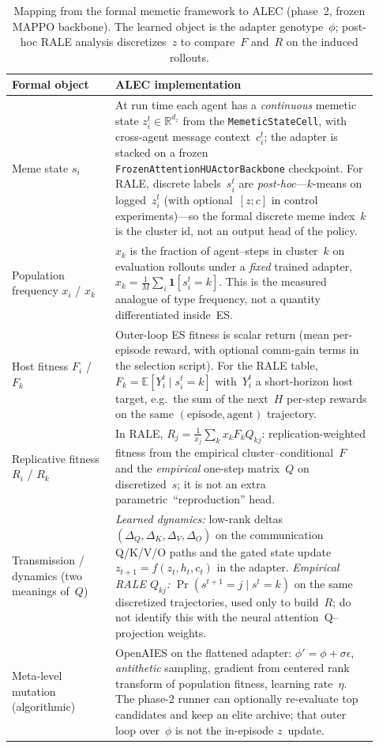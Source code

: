 
\begin{table}[t]
\centering
\small
\caption{Mapping from the formal memetic framework to ALEC (phase~2, frozen MAPPO backbone). The learned object is the adapter genotype~$\phi$; post-hoc RALE analysis discretizes~$z$ to compare~$F$ and~$R$ on the induced rollouts.}
\label{tab:alec_formal_mapping}
\begin{tabular}{p{0.26\linewidth}p{0.66\linewidth}}
\toprule
Formal object & ALEC implementation \\
\midrule
Meme state $s_i$ &
At run time each agent has a \emph{continuous} memetic state $z_i^t\in\mathbb{R}^{d_z}$ from the \texttt{MemeticStateCell}, with cross-agent message context~$c_i^t$; the adapter is stacked on a frozen \texttt{FrozenAttentionHUActorBackbone} checkpoint.
For RALE, discrete labels~$s_i^t$ are \emph{post-hoc}---$k$-means on logged~$z_i^t$ (with optional~$[z;c]$ in control experiments)---so the formal discrete meme index~$k$ is the cluster id, not an output head of the policy. \\[0.35em]
Population frequency $x_i$ / $x_k$ &
$x_k$ is the fraction of agent--steps in cluster~$k$ on evaluation rollouts under a \emph{fixed} trained adapter, $x_k=\frac{1}{M}\sum_i\mathbf{1}[s_i^t{=}k]$.
This is the measured analogue of type frequency, not a quantity differentiated inside~ES. \\[0.35em]
Host fitness $F_i$ / $F_k$ &
Outer-loop ES fitness is scalar return (mean per-episode reward, with optional comm-gain terms in the selection script). For the RALE table, $F_k=\mathbb{E}[Y_i^t\mid s_i^t{=}k]$ with~$Y_i^t$ a short-horizon host target, e.g.\ the sum of the next~$H$ per-step rewards on the same $(\text{episode},\text{agent})$ trajectory. \\[0.35em]
Replicative fitness $R_i$ / $R_k$ &
In RALE, $R_j=\frac{1}{x_j}\sum_k x_k F_k Q_{kj}$: replication-weighted fitness from the empirical cluster--conditional~$F$ and the \emph{empirical} one-step matrix~$Q$ on discretized~$s$; it is not an extra parametric~``reproduction'' head. \\[0.35em]
Transmission / dynamics (two meanings of~$Q$) &
\emph{Learned dynamics:} low-rank deltas $(\Delta_Q,\Delta_K,\Delta_V,\Delta_O)$ on the communication Q/K/V/O paths and the gated state update $z_{t+1}{=}f(z_t,h_t,c_t)$ in the adapter.
\emph{Empirical RALE $Q_{kj}$:} $\Pr(s^{t+1}{=}j\mid s^t{=}k)$ on the same discretized trajectories, used only to build~$R$; do not identify this with the neural attention~Q--projection weights. \\[0.35em]
Meta-level mutation (algorithmic) &
OpenAIES on the flattened adapter: $\phi'=\phi+\sigma\epsilon$, \emph{antithetic} sampling, gradient from centered rank transform of population fitness, learning rate~$\eta$.
The phase-2 runner can optionally re-evaluate top candidates and keep an elite archive; that outer loop over~$\phi$ is not the in-episode $z$~update. \\
\bottomrule
\end{tabular}
\end{table}
